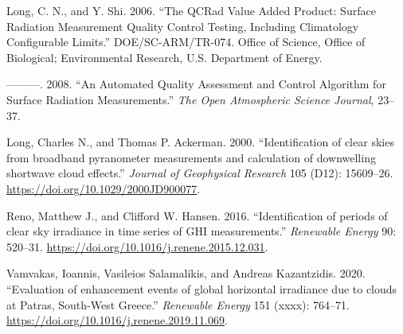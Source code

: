 \documentclass[
  11pt,
  a4paper,oneside]{article}
\newlength{\cslhangindent}
\newlength{\cslentryspacingunit} %
\newenvironment{CSLReferences}[2] %
 {%
  \setlength{\parindent}{0pt}
  \ifodd #1
  \let\oldpar\par
  \def\par{\hangindent=\cslhangindent\oldpar}
  \fi
  \setlength{\parskip}{#2\cslentryspacingunit}
 }%
 {}
\begin{document}
\hypertarget{refs}{}
\begin{CSLReferences}{1}{0}
\leavevmode{}%
Long, C. N., and Y. Shi. 2006. {``The QCRad Value Added Product: Surface Radiation Measurement Quality Control Testing, Including Climatology Configurable Limits.''} DOE/SC-ARM/TR-074. Office of Science, Office of Biological; Environmental Research, U.S. Department of Energy.

\leavevmode{}%
---------. 2008. {``An {Automated} {Quality} {Assessment} and {Control} {Algorithm} for {Surface} {Radiation} {Measurements}.''} \emph{The Open Atmospheric Science Journal}, 23--37.

\leavevmode{}%
Long, Charles N., and Thomas P. Ackerman. 2000. {``{Identification of clear skies from broadband pyranometer measurements and calculation of downwelling shortwave cloud effects}.''} \emph{Journal of Geophysical Research} 105 (D12): 15609--26. \url{https://doi.org/10.1029/2000JD900077}.

\leavevmode{}%
Reno, Matthew J., and Clifford W. Hansen. 2016. {``{Identification of periods of clear sky irradiance in time series of GHI measurements}.''} \emph{Renewable Energy} 90: 520--31. \url{https://doi.org/10.1016/j.renene.2015.12.031}.

\leavevmode{}%
Vamvakas, Ioannis, Vasileios Salamalikis, and Andreas Kazantzidis. 2020. {``{Evaluation of enhancement events of global horizontal irradiance due to clouds at Patras, South-West Greece}.''} \emph{Renewable Energy} 151 (xxxx): 764--71. \url{https://doi.org/10.1016/j.renene.2019.11.069}.

\end{CSLReferences}
\end{document}

